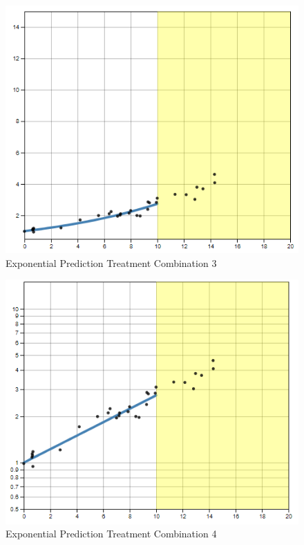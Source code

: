 \documentclass[print]{nuthesis}
\begin{document}
\begin{figure}[tbp]

{\centering \includegraphics[width=0.75\linewidth,]{images/low-15-linear} 

}

\caption{Exponential Prediction Treatment Combination 3}\label{fig:low-15-linear}
\end{figure}

\begin{figure}[tbp]

{\centering \includegraphics[width=0.75\linewidth,]{images/low-15-log} 

}

\caption{Exponential Prediction Treatment Combination 4}\label{fig:low-15-log}
\end{figure}
\end{document}
